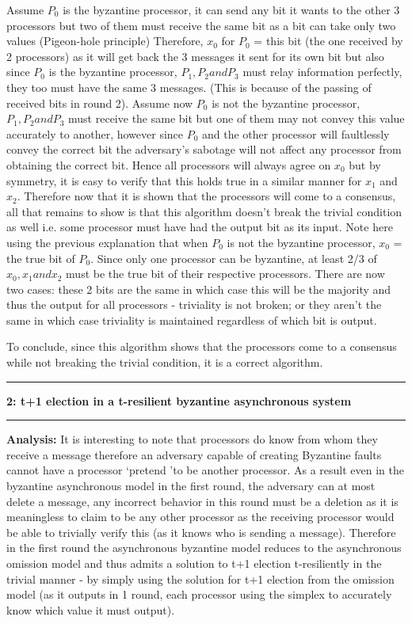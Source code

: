 \documentclass[11pt]{article}
\newcommand\question[2]{\vspace{.25in}\hrule\textbf{#1: #2}\vspace{.5em}\hrule\vspace{.10in}}
\newcommand\analysis{\vspace{.10in}\textbf{Analysis: }\newline}
\begin{document}
Assume $P_0$ is the byzantine processor, it can send any bit it wants to the other 3 processors but two of them must receive the same bit as a bit can take only two values (Pigeon-hole principle)
Therefore, $x_0$ for $P_0$ = this bit (the one received by 2 processors) as it will get back the 3 messages it sent for its own bit but also since $P_0$ is the byzantine processor, $P_1, P_2 and P_3$ must relay information perfectly, they too must have the same 3 messages. (This is because of the passing of received bits in round 2).\newline
Assume now $P_0$ is not the byzantine processor, $P_1, P_2 and P_3$ must receive the same bit but one of them may not convey this value accurately to another, however since $P_0$ and the other processor will faultlessly convey the correct bit the adversary's sabotage will not affect any processor from obtaining the correct bit.
\newline
Hence all processors will always agree on $x_0$ but by symmetry, it is easy to verify that this holds true in a similar manner for $x_1$ and $x_2$. 
\newline
Therefore now that it is shown that the processors will come to a consensus, all that remains to show is that this algorithm doesn't break the trivial condition as well i.e. some processor must have had the output bit as its input. Note here using the previous explanation that when $P_0$ is not the byzantine processor, $x_0$ = the true bit of $P_0$. Since only one processor can be byzantine, at least 2/3 of $x_0, x_1 and x_2$ must be the true bit of their respective processors. There are now two cases: these 2 bits are the same in which case this will be the majority and thus the output for all processors - triviality is not broken; or they aren't the same in which case triviality is maintained regardless of which bit is output. 
\newline

To conclude, since this algorithm shows that the processors come to a consensus while not breaking the trivial condition, it is a correct algorithm. 
\newpage

\question{2}{t+1 election in a t-resilient byzantine asynchronous system} 

\analysis
It is interesting to note that processors do know from whom they receive a message therefore an adversary capable of creating Byzantine faults cannot have a processor \lq pretend \rq to be another processor. As a result even in the byzantine asynchronous model in the first round, the adversary can at most delete a message, any incorrect behavior in this round must be a deletion as it is meaningless to claim to be any other processor as the receiving processor would be able to trivially verify this (as it knows who is sending a message). Therefore in the first round the asynchronous byzantine model reduces to the asynchronous omission model and thus admits a solution to t+1 election t-resiliently in the trivial manner - by simply using the solution for t+1 election from the omission model (as it outputs in 1 round, each processor using the simplex to accurately know which value it must output). 
\end{document}

